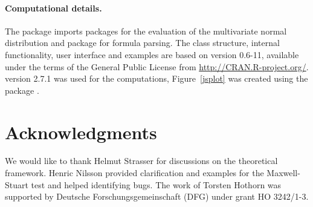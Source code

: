 \documentclass[article]{jss}
\begin{document}
\paragraph{Computational details.}

The  package imports packages 
\citep{PKG:mvtnorm} for the evaluation of the multivariate normal
distribution and package  \citep{PKG:modeltools} for
formula parsing.
The class structure, internal functionality, user interface and examples are
based on  version 0.6-11, available
under the terms of the General Public License from \url{http://CRAN.R-project.org/}. 
 version 2.7.1 \citep{rcore2007}
was used for the computations, Figure~\ref{jsplot} was created using the  
package \citep{vcd}.

\section*{Acknowledgments}
 
We would like to thank Helmut Strasser for discussions on the theoretical framework.
Henric Nilsson provided clarification and examples for the Maxwell-Stuart test and helped
identifying bugs. The work of Torsten Hothorn was supported by Deutsche Forschungsgemeinschaft (DFG) 
under grant HO 3242/1-3.



\newpage
\end{document}
